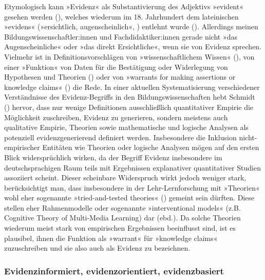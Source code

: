 \documentclass[
  man,
  floatsintext,
  longtable,
  nolmodern,
  notxfonts,
  notimes,
  colorlinks=true,linkcolor=blue,citecolor=blue,urlcolor=blue]{apa7}
\begin{document}
Etymologisch kann »Evidenz« als Substantivierung des Adjektivs »evident«
gesehen werden (), welches
wiederum im 18. Jahrhundert dem lateinischen »evidens« (»ersichtlich,
augenscheinlich«, ) entlehnt
wurde (). Allerdings meinen
Bildungswissenschaftler:innen und Fachdidaktiker:innen gerade nicht »das
Augenscheinliche« oder »das direkt Ersichtliche«, wenn sie von Evidenz
sprechen. Vielmehr ist in Definitionsvorschlägen von »wissenschaftlichem
Wissen« (), von einer »Funktion«
von Daten für die Bestätigung oder Widerlegung von Hypothesen und
Theorien () oder von
»warrants for making assertions or knowledge claims«
() die
Rede. In einer aktuellen Systematisierung verschiedener Verständnisse
des Evidenz-Begriffs in den Bildungswissenschaften hebt Schmidt
() hervor, dass nur wenige Definitionen
ausschließlich quantitativer Empirie die Möglichkeit zuschreiben,
Evidenz zu generieren, sondern meistens auch qualitative Empirie,
Theorien sowie mathematische und logische Analysen als potenziell
evidenzgenerierend definiert werden. Insbesondere die Inklusion
nicht-empirischer Entitäten wie Theorien oder logische Analysen mögen
auf den ersten Blick widersprüchlich wirken, da der Begriff Evidenz
insbesondere im deutschsprachigen Raum teils mit Ergebnissen
explanativer quantitativer Studien assoziiert scheint. Dieser scheinbare
Widerspruch wirkt jedoch weniger stark, berücksichtigt man, dass
insbesondere in der Lehr-Lernforschung mit »Theorien« wohl eher
sogenannte »tried-and-tested theories« () gemeint sein dürften. Diese stellen eher Rahmenmodelle oder
sogenannte »interventional models« (z.B. Cognitive Theory of Multi-Media
Learning) dar (ebd.). Da solche Theorien wiederum meist stark von
empirischen Ergebnissen beeinflusst sind, ist es plausibel, ihnen die
Funktion als »warrant« für »knowledge claims« zuzuschreiben und sie also
auch als Evidenz zu bezeichnen.

\subsubsection{Evidenzinformiert, evidenzorientiert,
evidenzbasiert}\label{evidenzinformiert-evidenzorientiert-evidenzbasiert}
\end{document}
